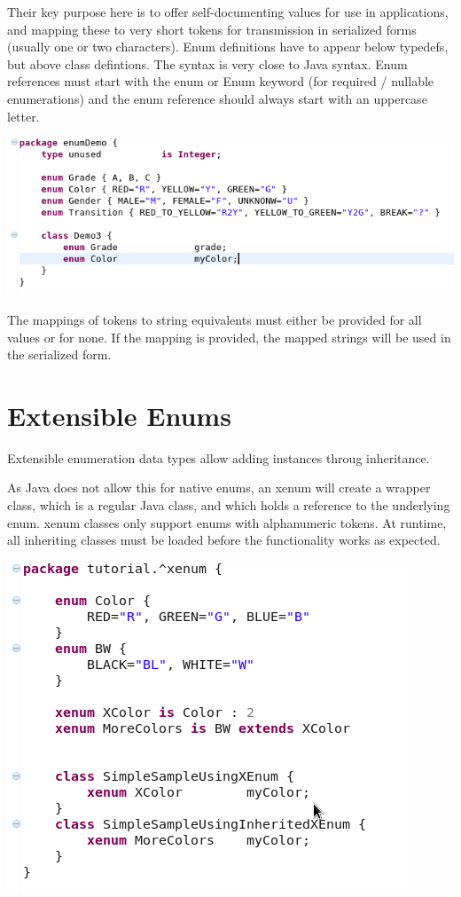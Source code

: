 \documentclass[11pt,a4paper,oneside]{article}
\begin{document}
Their key purpose here is to offer self-documenting values for use in applications, and mapping these to very short tokens
for transmission in serialized forms (usually one or two characters).
Enum definitions have to appear below typedefs, but above class defintions.
The syntax is very close to Java syntax. Enum references must start with the {\ttfamily enum} or {\ttfamily Enum} keyword
 (for required / nullable enumerations) and the enum reference should always start with an uppercase letter.


\vspace{2mm}

\hspace{1cm}\includegraphics[scale=0.5]{images/tut1-013-enum.png}

\noindent The mappings of tokens to string equivalents must either be provided for all values or for none. If the mapping is provided, the
mapped strings will be used in the serialized form.


\section{Extensible Enums}
Extensible enumeration data types allow adding instances throug inheritance.

As Java does not allow this for native enums, an {\ttfamily xenum} will create a wrapper class, which is a regular Java class,
and which holds a reference to the underlying enum. {\ttfamily xenum} classes only support {\ttfamily enum}s with alphanumeric
tokens. At runtime, all inheriting classes must be loaded before the functionality works as expected.

\vspace{2mm}

\hspace{1cm}\includegraphics[scale=0.5]{images/tut1-xenum.png}
\end{document}
